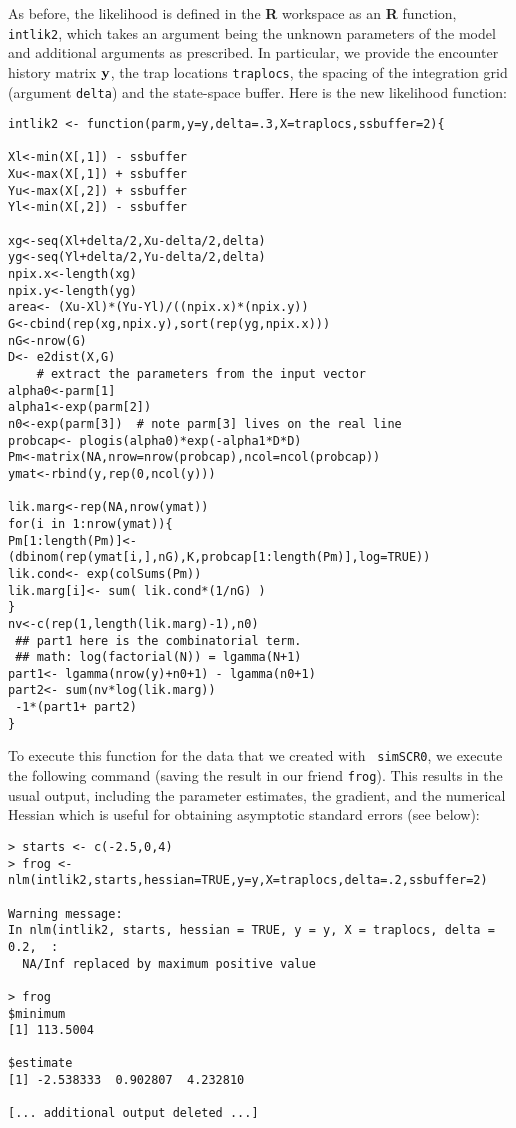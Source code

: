As before, the likelihood is defined in the {\bf R} workspace as an
{\bf R}
function, \mbox{\tt intlik2}, 
 which takes an argument being the unknown parameters of the
model and additional arguments as prescribed. In particular, 
 we provide the encounter history matrix ${\bf y}$, the trap locations
\mbox{\tt traplocs}, the spacing of the integration grid (argument
\mbox{\tt delta}) and the
state-space buffer. Here is the new likelihood function: 
{\small
\begin{verbatim}
intlik2 <- function(parm,y=y,delta=.3,X=traplocs,ssbuffer=2){

Xl<-min(X[,1]) - ssbuffer
Xu<-max(X[,1]) + ssbuffer
Yu<-max(X[,2]) + ssbuffer
Yl<-min(X[,2]) - ssbuffer

xg<-seq(Xl+delta/2,Xu-delta/2,delta) 
yg<-seq(Yl+delta/2,Yu-delta/2,delta) 
npix.x<-length(xg)
npix.y<-length(yg)
area<- (Xu-Xl)*(Yu-Yl)/((npix.x)*(npix.y))
G<-cbind(rep(xg,npix.y),sort(rep(yg,npix.x)))
nG<-nrow(G)
D<- e2dist(X,G) 
    # extract the parameters from the input vector
alpha0<-parm[1]
alpha1<-exp(parm[2])
n0<-exp(parm[3])  # note parm[3] lives on the real line
probcap<- plogis(alpha0)*exp(-alpha1*D*D)
Pm<-matrix(NA,nrow=nrow(probcap),ncol=ncol(probcap))
ymat<-rbind(y,rep(0,ncol(y)))

lik.marg<-rep(NA,nrow(ymat))
for(i in 1:nrow(ymat)){
Pm[1:length(Pm)]<- (dbinom(rep(ymat[i,],nG),K,probcap[1:length(Pm)],log=TRUE))
lik.cond<- exp(colSums(Pm))
lik.marg[i]<- sum( lik.cond*(1/nG) )  
}                                                 
nv<-c(rep(1,length(lik.marg)-1),n0)
 ## part1 here is the combinatorial term. 
 ## math: log(factorial(N)) = lgamma(N+1)
part1<- lgamma(nrow(y)+n0+1) - lgamma(n0+1)
part2<- sum(nv*log(lik.marg))
 -1*(part1+ part2)
}
\end{verbatim}
} 
To execute this function for the data that we created with \mbox{\tt
  simSCR0}, we execute the following command (saving the result in our
friend \mbox{\tt frog}).  This results in the usual output, including
the parameter estimates, the gradient, and the numerical Hessian which
is useful for obtaining asymptotic standard errors (see below):
\begin{verbatim}
> starts <- c(-2.5,0,4)
> frog <- nlm(intlik2,starts,hessian=TRUE,y=y,X=traplocs,delta=.2,ssbuffer=2)

Warning message:
In nlm(intlik2, starts, hessian = TRUE, y = y, X = traplocs, delta = 0.2,  :
  NA/Inf replaced by maximum positive value

> frog
$minimum
[1] 113.5004

$estimate
[1] -2.538333  0.902807  4.232810

[... additional output deleted ...]
\end{verbatim}
